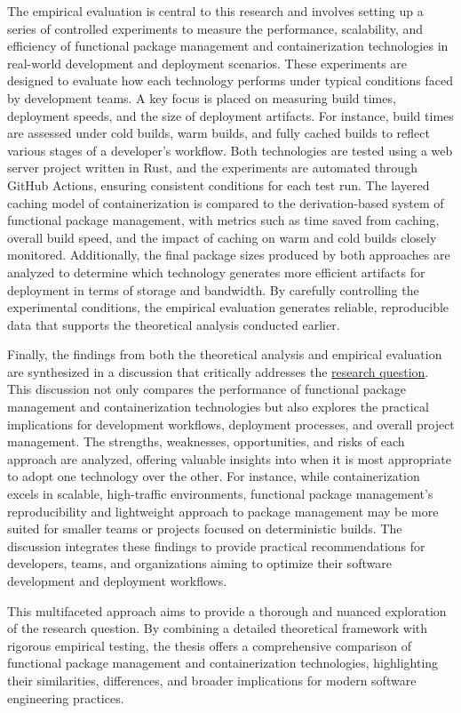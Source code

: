 The empirical evaluation is central to this research and involves setting up a series of
controlled experiments to measure the performance, scalability, and efficiency of functional
package management and containerization technologies in real-world development and deployment
scenarios. These experiments are designed to evaluate how each technology performs under
typical conditions faced by development teams. A key focus is placed on measuring build
times, deployment speeds, and the size of deployment artifacts. For instance, build times
are assessed under cold builds, warm builds, and fully cached builds to reflect various
stages of a developer’s workflow. Both technologies are tested using a web server project
written in Rust, and the experiments are automated through GitHub Actions, ensuring consistent
conditions for each test run. The layered caching model of containerization is compared
to the derivation-based system of functional package management, with metrics such as time
saved from caching, overall build speed, and the impact of caching on warm and cold builds
closely monitored. Additionally, the final package sizes produced by both approaches are
analyzed to determine which technology generates more efficient artifacts for deployment
in terms of storage and bandwidth. By carefully controlling the experimental conditions,
the empirical evaluation generates reliable, reproducible data that supports the theoretical
analysis conducted earlier.

Finally, the findings from both the theoretical analysis and empirical evaluation are
synthesized in a discussion that critically addresses the \hyperlink{research_question}
{research question}. This discussion not only compares the performance of functional
package management and containerization technologies but also explores the practical
implications for development workflows, deployment processes, and overall project
management. The strengths, weaknesses, opportunities, and risks of each approach are
analyzed, offering valuable insights into when it is most appropriate to adopt one
technology over the other. For instance, while containerization excels in scalable,
high-traffic environments, functional package management’s reproducibility and lightweight
approach to package management may be more suited for smaller teams or projects focused
on deterministic builds. The discussion integrates these findings to provide practical
recommendations for developers, teams, and organizations aiming to optimize their software
development and deployment workflows.

This multifaceted approach aims to provide a thorough and nuanced exploration of the
research question. By combining a detailed theoretical framework with rigorous empirical
testing, the thesis offers a comprehensive comparison of functional package management
and containerization technologies, highlighting their similarities, differences, and
broader implications for modern software engineering practices.
